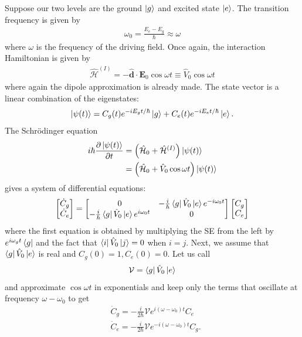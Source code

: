 \documentclass{book}
\theoremstyle{definition}
\newcommand{\p}{\partial}
\newcommand{\ham}{\mathcal{H}}
\newcommand{\f}[2]{\frac{#1}{#2}}
\newcommand{\lp}{\left(}
\newcommand{\rp}{\right)}
\begin{document}
Suppose our two levels are the ground $\ket{g}$ and excited state $\ket{e}$. The transition frequency is given by
\begin{align}
\omega_0 = \f{E_e - E_g}{\hbar} \approx \omega
\end{align}
where $\omega$ is the frequency of the driving field. Once again, the interaction Hamiltonian is given by
\begin{align}
\hat{\ham}^{(I)} = -\hat{\mathbf{d}}\cdot\mathbf{E}_0 \cos\omega t \equiv \hat{V}_0 \cos\omega t
\end{align}
where again the dipole approximation is already made. The state vector is a linear combination of the eigenstates:
\begin{align}
\ket{\psi(t)} = C_g(t)e^{-iE_gt/\hbar}\ket{g} + C_e(t)e^{-iE_et/\hbar}\ket{e}.
\end{align}
The Schr\"{o}dinger equation
\begin{align}
i\hbar \f{\p \ket{\psi(t)}}{\p t} &= \lp \hat{\ham}_0 + \hat{\ham}^{(I)} \rp \ket{\psi(t)}\\
&=\lp \hat{\ham}_0 + \hat{V}_0 \cos\omega t \rp \ket{\psi(t)}
\end{align}
gives a system of differential equations:
\begin{align}
\begin{bmatrix}
\dot{C}_g \\ \dot{C}_e
\end{bmatrix}
=
\begin{bmatrix}
0 &-\f{i}{\hbar}\bra{g}\hat{V}_0 \ket{e}e^{-i\omega_0 t} \\ 
-\f{i}{\hbar}\bra{g}\hat{V}_0 \ket{e}e^{i\omega_0 t} & 0
\end{bmatrix}
\begin{bmatrix}
C_g \\ C_e
\end{bmatrix}
\end{align}
where the first equation is obtained by multiplying the SE from the left by $e^{i\omega_g t}\bra{g}$ and the fact that $\bra{i}\hat{V}_0\ket{j} = 0$ when $i = j$. Next, we assume that $\bra{g}\hat{V}_0 \ket{e}$ is real and $C_g(0) = 1, C_e(0) = 0$. Let us call
\begin{align}
\mathcal{V} = \bra{g}\hat{V}_0 \ket{e}
\end{align}
and approximate $\cos\omega t$ in exponentials and keep only the terms that oscillate at frequency $\omega - \omega_0$ to get
\begin{align}
&\dot{C}_g = -\f{i}{2\hbar}\mathcal{V}e^{i(\omega - \omega_0 )t}C_e\\
&\dot{C}_e = -\f{i}{2\hbar}\mathcal{V}e^{-i(\omega - \omega_0 )t}C_g.
\end{align}
\end{document}
